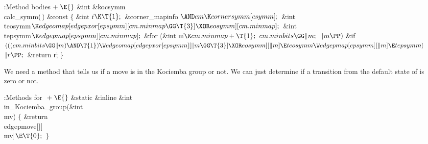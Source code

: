 \Y\B\4:Method bodies\X${}\mathrel+\E{}$\6
\&{int} \&{kocsymm}\DC\\{calc\_symm}(\,) \&{const}\1\1\2\2\6
${}\{{}$\1\6
\&{int} \|r${}\K\T{1};{}$\6
\&{corner\_mapinfo} ${}{\AND}\\{cm}\K\\{cornersymm}[\\{csymm}];{}$\6
\&{int} \\{teosymm}${}\K\\{edgeomap}[\\{edgepxor}[\\{epsymm}][\\{cm}.\\{minmap}%
\GG\T{3}]\XOR\\{eosymm}][\\{cm}.\\{minmap}];{}$\6
\&{int} \\{tepsymm}${}\K\\{edgepmap}[\\{epsymm}][\\{cm}.\\{minmap}];{}$\7
\&{for} (\&{int} \|m${}\K\\{cm}.\\{minmap}+\T{1};{}$ ${}\\{cm}.\\{minbits}\GG%
\|m;{}$ ${}\|m\PP){}$\1\6
\&{if} ${}(((\\{cm}.\\{minbits}\GG\|m)\AND\T{1})\W\\{edgeomap}[\\{edgepxor}[%
\\{epsymm}][\|m\GG\T{3}]\XOR\\{eosymm}][\|m]\E\\{teosymm}\W\\{edgepmap}[%
\\{epsymm}][\|m]\E\\{tepsymm}){}$\1\5
${}\|r\PP;{}$\2\2\6
\&{return} \|r;\6
\4${}\}{}$\2\par
\fi

We need a method that tells us if a move is in the Kociemba
group or not.  We can just determine if a transition from the
default state of  is zero or not.

\Y\B\4:Methods for \X${}\mathrel+\E{}$\6
\&{static} \&{inline} \&{int} \\{in\_Kociemba\_group}(\&{int} \\{mv})\1\1\2\2\6
${}\{{}$\1\6
\&{return} \\{edgepmove}[][\\{mv}]${}\E\T{0};{}$\6
\4${}\}{}$\2\par
\fi

